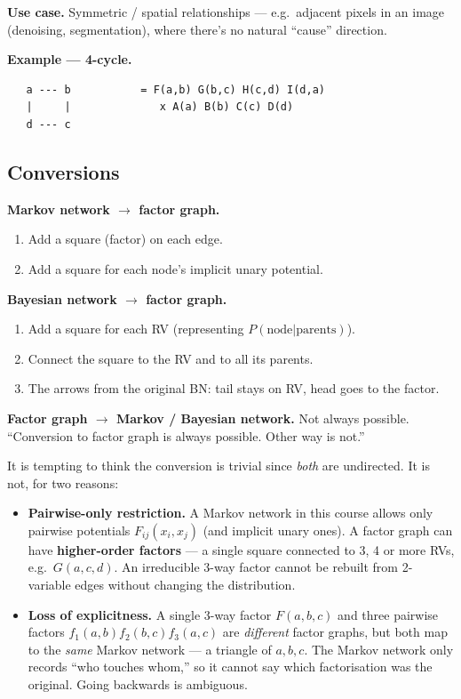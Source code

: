 \documentclass[11pt, a4paper]{article}
\begin{document}
\textbf{Use case.} Symmetric / spatial relationships — e.g.\ adjacent pixels in an image (denoising, segmentation), where there's no natural ``cause'' direction.

\textbf{Example — 4-cycle.}

\begin{verbatim}
   a --- b           = F(a,b) G(b,c) H(c,d) I(d,a)
   |     |              x A(a) B(b) C(c) D(d)
   d --- c
\end{verbatim}

\subsection{Conversions}

\textbf{Markov network $\to$ factor graph.}
\begin{enumerate}
  \item Add a square (factor) on each edge.
  \item Add a square for each node's implicit unary potential.
\end{enumerate}

\textbf{Bayesian network $\to$ factor graph.}
\begin{enumerate}
  \item Add a square for each RV (representing $P(\text{node}|\text{parents})$).
  \item Connect the square to the RV and to all its parents.
  \item The arrows from the original BN: tail stays on RV, head goes to the factor.
\end{enumerate}

\textbf{Factor graph $\to$ Markov / Bayesian network.} Not always possible. ``Conversion to factor graph is always possible. Other way is not.''

\begin{notebox}
It is tempting to think the conversion is trivial since \emph{both} are undirected. It is not, for two reasons:
\begin{itemize}
  \item \textbf{Pairwise-only restriction.} A Markov network in this course allows only pairwise potentials $F_{ij}(x_i,x_j)$ (and implicit unary ones). A factor graph can have \textbf{higher-order factors} — a single square connected to 3, 4 or more RVs, e.g.\ $G(a,c,d)$. An irreducible 3-way factor cannot be rebuilt from 2-variable edges without changing the distribution.
  \item \textbf{Loss of explicitness.} A single 3-way factor $F(a,b,c)$ and three pairwise factors $f_1(a,b)f_2(b,c)f_3(a,c)$ are \emph{different} factor graphs, but both map to the \emph{same} Markov network — a triangle of $a,b,c$. The Markov network only records ``who touches whom,'' so it cannot say which factorisation was the original. Going backwards is ambiguous.
\end{itemize}
\end{notebox}
\end{document}
